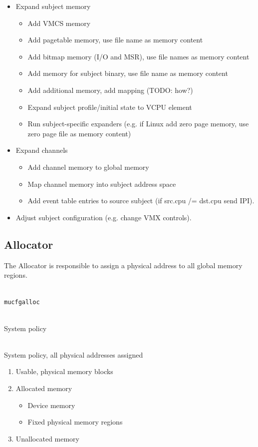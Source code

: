 \documentclass[a4paper,twoside,titlepage]{article}
\begin{document}
\begin{itemize}
	\item Expand subject memory
		\begin{itemize}
			\item Add VMCS memory
			\item Add pagetable memory, use file name as memory content
			\item Add bitmap memory (I/O and MSR), use file names as memory content
			\item Add memory for subject binary, use file name as memory content
			\item Add additional memory, add mapping (TODO: how?)
			\item Expand subject profile/initial state to VCPU element
			\item Run subject-specific expanders (e.g. if Linux add zero page
				memory, use zero page file as memory content)
		\end{itemize}
	\item Expand channels
		\begin{itemize}
			\item Add channel memory to global memory
			\item Map channel memory into subject address space
			\item Add event table entries to source subject
				(if src.cpu /= dst.cpu send IPI).
		\end{itemize}
	\item Adjust subject configuration (e.g. change VMX controls).
\end{itemize}

\subsection{Allocator}
The Allocator is responsible to assign a physical address to all global memory
regions.

\begin{description} \itemsep1pt \parskip0pt
	\item[Name] \hfill \\
		\texttt{mucfgalloc}
	\item[Input] \hfill \\
		System policy
	\item[Output] \hfill \\
		System policy, all physical addresses assigned
	\item[Data] \hfill
		\begin{enumerate}
			\item Usable, physical memory blocks
			\item Allocated memory
				\begin{itemize}
					\item Device memory
					\item Fixed physical memory regions
				\end{itemize}
			\item Unallocated memory
		\end{enumerate}
\end{description}
\end{document}
